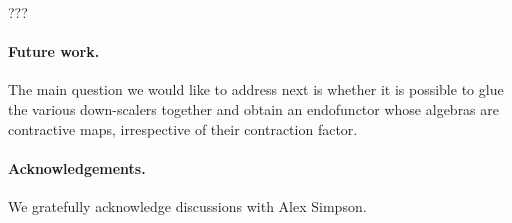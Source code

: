 \documentclass[11pt,a4paper]{article}
\begin{document}
\begin{example}
  ???
\end{example}

\paragraph{Future work.}
The main question we would like to address next is whether
it is possible to glue the various down-scalers together
and obtain an endofunctor whose algebras are
contractive maps, irrespective of their contraction
factor. 



\paragraph{Acknowledgements.} 
We gratefully acknowledge discussions with Alex Simpson.



\end{document}
